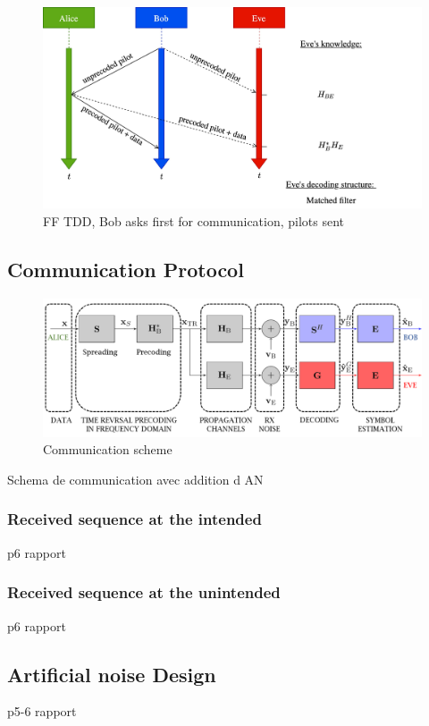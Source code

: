 \documentclass[journal,comsoc]{IEEEtran}
\let\MYoriglatexcaption\caption
\renewcommand{\caption}[2][\relax]{\MYoriglatexcaption[#2]{#2}}
\begin{document}
\begin{figure}[!t]
	\centering
	\includegraphics[width=.8\linewidth]{graphs/diagram_sequence-FF_TDD_B_pilot.jpg}
	\caption{FF TDD, Bob asks first for communication, pilots sent}
	\label{fig_ff_tdd_b_pilot}
\end{figure}


\subsection{Communication Protocol}
\begin{figure}[h!t]
	\centering
	\includegraphics[width=1\linewidth]{graphs/com_scheme.PNG}
	\caption{Communication scheme}
	\label{fig_com_scheme}
\end{figure}
{\color{red}Schema de communication avec addition d AN}

\subsubsection{Received sequence at the intended }
{\color{red} p6 rapport}
\subsubsection{Received sequence at the unintended}
{\color{red} p6 rapport}

\subsection{Artificial noise Design}
{\color{red} p5-6 rapport}
\end{document}
